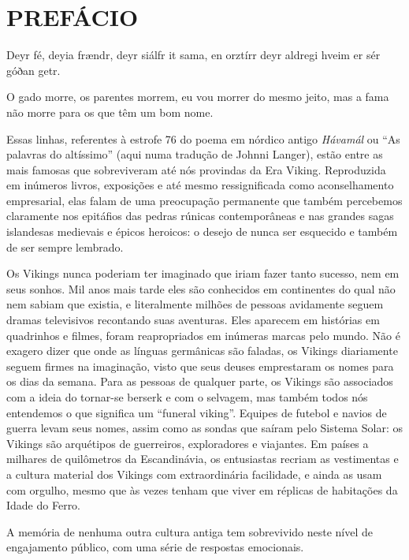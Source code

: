 \chapter{PREFÁCIO}\label{prefuxe1cio}

Deyr fé, deyia frændr, deyr siálfr it sama, en orztírr deyr aldregi
hveim er sér góðan getr.

O gado morre, os parentes morrem, eu vou morrer do mesmo jeito, mas a
fama não morre para os que têm um bom nome.

Essas linhas, referentes à estrofe 76 do poema em nórdico antigo
\emph{Hávamál} ou ``As palavras do altíssimo'' (aqui numa tradução de
Johnni Langer), estão entre as mais famosas que sobreviveram até nós
provindas da Era Viking. Reproduzida em inúmeros livros, exposições e
até mesmo ressignificada como aconselhamento empresarial, elas falam de
uma preocupação permanente que também percebemos claramente nos
epitáfios das pedras rúnicas contemporâneas e nas grandes sagas
islandesas medievais e épicos heroicos: o desejo de nunca ser esquecido
e também de ser sempre lembrado.

Os Vikings nunca poderiam ter imaginado que iriam fazer tanto sucesso,
nem em seus sonhos. Mil anos mais tarde eles são conhecidos em
continentes do qual não nem sabiam que existia, e literalmente milhões
de pessoas avidamente seguem dramas televisivos recontando suas
aventuras. Eles aparecem em histórias em quadrinhos e filmes, foram
reapropriados em inúmeras marcas pelo mundo. Não é exagero dizer que
onde as línguas germânicas são faladas, os Vikings diariamente seguem
firmes na imaginação, visto que seus deuses emprestaram os nomes para os
dias da semana. Para as pessoas de qualquer parte, os Vikings são
associados com a ideia do tornar-se berserk e com o selvagem, mas também
todos nós entendemos o que significa um ``funeral viking''. Equipes de
futebol e navios de guerra levam seus nomes, assim como as sondas que
saíram pelo Sistema Solar: os Vikings são arquétipos de guerreiros,
exploradores e viajantes. Em países a milhares de quilômetros da
Escandinávia, os entusiastas recriam as vestimentas e a cultura material
dos Vikings com extraordinária facilidade, e ainda as usam com orgulho,
mesmo que às vezes tenham que viver em réplicas de habitações da Idade
do Ferro.

A memória de nenhuma outra cultura antiga tem sobrevivido neste nível de
engajamento público, com uma série de respostas emocionais.

